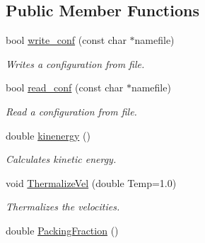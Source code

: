 \subsection*{Public Member Functions}
\begin{CompactItemize}
\item 
\hypertarget{classSimBox_c8d388ca320eee5ae08ac7333f8cff77}{
bool \hyperlink{classSimBox_c8d388ca320eee5ae08ac7333f8cff77}{write\_\-conf} (const char $\ast$namefile)}
\label{classSimBox_c8d388ca320eee5ae08ac7333f8cff77}

\begin{CompactList}\small\item\em Writes a configuration from file. \item\end{CompactList}\item 
\hypertarget{classSimBox_19bc9e4e412283c5c2408d9a0fcd49a2}{
bool \hyperlink{classSimBox_19bc9e4e412283c5c2408d9a0fcd49a2}{read\_\-conf} (const char $\ast$namefile)}
\label{classSimBox_19bc9e4e412283c5c2408d9a0fcd49a2}

\begin{CompactList}\small\item\em Read a configuration from file. \item\end{CompactList}\item 
\hypertarget{classSimBox_73b5b825eab01b2ac16769b14fcc53d1}{
double \hyperlink{classSimBox_73b5b825eab01b2ac16769b14fcc53d1}{kinenergy} ()}
\label{classSimBox_73b5b825eab01b2ac16769b14fcc53d1}

\begin{CompactList}\small\item\em Calculates kinetic energy. \item\end{CompactList}\item 
\hypertarget{classSimBox_769142b84fa75582cf8263e6e43562b2}{
void \hyperlink{classSimBox_769142b84fa75582cf8263e6e43562b2}{ThermalizeVel} (double Temp=1.0)}
\label{classSimBox_769142b84fa75582cf8263e6e43562b2}

\begin{CompactList}\small\item\em Thermalizes the velocities. \item\end{CompactList}\item 
\hypertarget{classSimBox_d5c1b5becc011f680d7327b4047364c9}{
double \hyperlink{classSimBox_d5c1b5becc011f680d7327b4047364c9}{PackingFraction} ()}
\label{classSimBox_d5c1b5becc011f680d7327b4047364c9}


\end{CompactItemize}
